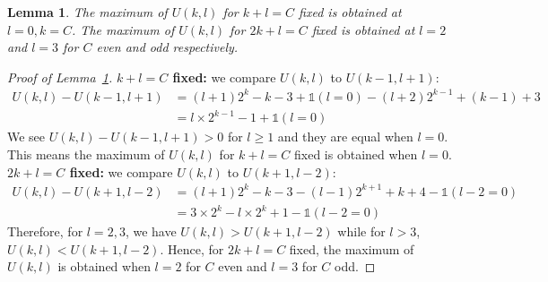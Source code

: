 \documentclass{article}
\newtheorem{lemma}[theorem]{Lemma}
\begin{document}
\begin{lemma} \label{lemma:Ukl_comparisons}
The maximum of $U(k,l)$ for $k+l=C$ fixed is obtained at $l=0, k=C$. The maximum of $U(k,l)$ for $2k+l=C$ fixed is obtained at $l=2$ and $l=3$ for $C$ even and odd respectively. 
\end{lemma}
\begin{proof}[Proof of Lemma~\ref{lemma:Ukl_comparisons}]
\textbf{$k+l=C$ fixed:} we compare $U(k,l)$ to $U(k-1, l+1)$: 
\begin{align*}
    U(k,l) - U(k-1, l+1) &= (l+1) 2^{k} -k-3 +\mathds{1}(l =0) - (l+2) 2^{k-1} + (k-1)+3  \\
    &= l \times 2^{k-1} -1 + \mathds{1}(l =0) 
\end{align*}
We see $U(k,l) - U(k-1, l+1) >0$ for $l \geq 1$ and they are equal when $l=0$. This means the maximum of $U(k,l)$ for $k+l=C$ fixed is obtained when $l=0$. \\

\noindent \textbf{$2k+l=C$ fixed:} we compare $U(k,l)$ to $U(k+1, l-2)$: 
\begin{align*}
    U(k,l) - U(k+1, l-2) &= (l+1) 2^k -k-3 - (l-1) 2^{k+1} +k+4 -\mathds{1}(l-2 =0) \\
    &= 3 \times 2^k - l \times 2^k +1 -\mathds{1}(l-2 =0)
\end{align*}
Therefore, for $l=2,3$, we have $U(k,l) > U(k+1, l-2)$ while for $l>3$, $U(k,l) < U(k+1, l-2)$. Hence, for $2k+l=C$ fixed, the maximum of $U(k,l)$ is obtained when $l=2$ for $C$ even and $l=3$ for $C$ odd. 
\end{proof}
\end{document}
